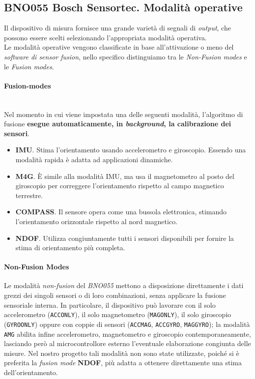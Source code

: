 \documentclass[11pt]{report}
\begin{document}
	\subsection{BNO055 Bosch Sensortec. Modalità operative}
	Il dispositivo di misura fornisce una grande varietà di segnali di \textit{output}, che possono essere scelti selezionando l'appropriata modalità operativa.\\
	Le modalità operative vengono classificate in base all'attivazione o meno del \textit{software di sensor fusion}, nello specifico distinguiamo tra le \textit{Non-Fusion modes} e le \textit{Fusion modes}.
	\paragraph{Fusion-modes}\mbox{}\\
	Nel momento in cui viene impostata una delle seguenti modalità, l'algoritmo di fusione \textbf{esegue automaticamente, in \textit{background}, la calibrazione dei sensori}.
	\begin{itemize}
		\item \textbf{IMU}. Stima l'orientamento usando accelerometro e giroscopio. Essendo una modalità rapida è adatta ad applicazioni dinamiche.
		\item \textbf{M4G}. È simile alla modalità IMU, ma usa il magnetometro al posto del giroscopio per correggere l'orientamento rispetto al campo magnetico terrestre.
		\item \textbf{COMPASS}. Il sensore opera come una bussola elettronica, stimando l'orientamento orizzontale rispetto al nord magnetico.
		\item \textbf{NDOF}. Utilizza congiuntamente tutti i sensori disponibili per fornire la stima di orientamento più completa.
	\end{itemize}

	\paragraph{Non-Fusion Modes}
	Le modalità \textit{non-fusion} del \textit{BNO055} mettono a disposizione direttamente i dati grezzi dei singoli sensori o di loro combinazioni, senza applicare la fusione sensoriale interna. In particolare, il dispositivo può lavorare con il solo accelerometro (\texttt{ACCONLY}), il solo magnetometro (\texttt{MAGONLY}), il solo giroscopio (\texttt{GYROONLY}) oppure con coppie di sensori (\texttt{ACCMAG}, \texttt{ACCGYRO}, \texttt{MAGGYRO}); la modalità \texttt{AMG} abilita infine accelerometro, magnetometro e giroscopio contemporaneamente, lasciando però al microcontrollore esterno l'eventuale elaborazione congiunta delle misure. Nel nostro progetto tali modalità non sono state utilizzate, poiché si è preferita la \textit{fusion mode} \textbf{NDOF}, più adatta a ottenere direttamente una stima dell'orientamento.
	
\end{document}
